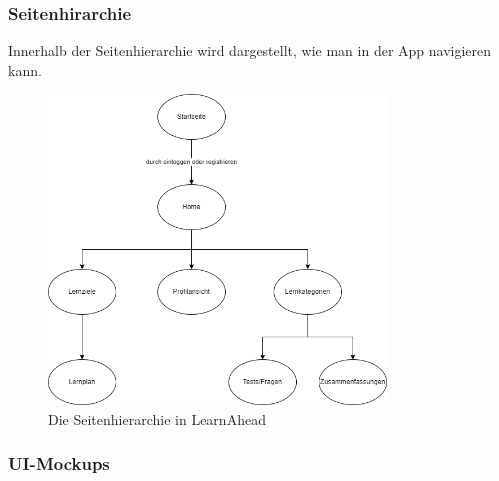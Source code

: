 \subsubsection{Seitenhirarchie}
Innerhalb der Seitenhierarchie wird dargestellt, wie man in der App navigieren kann.
\begin{figure}[H]
    \centering
    \includegraphics[width=0.8\textwidth]{images/diagramme/Seitenhierarchie.png}
    \caption{Die Seitenhierarchie in LearnAhead}
    \label{fig:UseCaseDiagramm}
\end{figure}

\newpage
\subsubsection{UI-Mockups}


